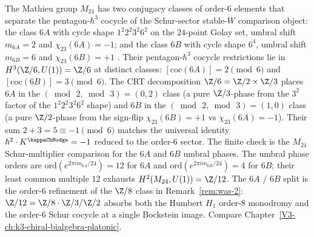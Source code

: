 \begin{remark}
\label{rem:was-6A-6B}
The Mathieu group $M_{24}$ has two conjugacy classes of order-$6$
elements that separate the pentagon-$\hbar^3$ cocycle of the
Schur-sector stable-$W$ comparison object:
the class $6A$ with cycle shape $1^2 2^2 3^2 6^2$ on the $24$-point
Golay set, umbral shift $m_{6A} = 2$ and $\chi_{23}(6A) = -1$; and
the class $6B$ with cycle shape $6^4$, umbral shift $m_{6B} = 6$ and
$\chi_{23}(6B) = +1$ \cite{ChengDuncanHarvey2014,ConwayCurtisNortonParkerWilson1985}.
Their pentagon-$\hbar^3$ cocycle restrictions lie in
$H^3(\Z/6, U(1)) = \Z/6$ at distinct classes:
$[\mathrm{coc}(6A)] = 2 \pmod{6}$ and $[\mathrm{coc}(6B)] = 3 \pmod{6}$.
The CRT decomposition $\Z/6 = \Z/2 \times \Z/3$ places $6A$ in the
$(\bmod\,2,\bmod\,3) = (0,2)$ class (a pure $\Z/3$-phase from the
$3^2$ factor of the $1^2 2^2 3^2 6^2$ shape) and $6B$ in the
$(\bmod\,2,\bmod\,3) = (1,0)$ class (a pure $\Z/2$-phase from the
sign-flip $\chi_{23}(6B) = +1$ vs $\chi_{23}(6A) = -1$). Their sum
$2 + 3 = 5 \equiv -1 \pmod 6$ matches the universal identity
$\hbar^2 \cdot K^{\kappaChHodge} = -1$ reduced to the order-$6$
sector. The finite check is the $M_{24}$ Schur-multiplier comparison
for the $6A$ and $6B$ umbral phases.
The umbral phase orders are $\mathrm{ord}(e^{2\pi i m_{6A}/24}) = 12$
for $6A$ and $\mathrm{ord}(e^{2\pi i m_{6B}/24}) = 4$ for $6B$; their
least common multiple $12$ exhausts $H^2(M_{24}, U(1)) = \Z/12$.
The $6A$ / $6B$ split is the order-$6$ refinement of the $\Z/8$ class
in Remark~\ref{rem:was-2}: $\Z/12 = \Z/8 \cdot \Z/3 / \Z/2$
absorbs both the Humbert $H_1$ order-$8$ monodromy and the order-$6$
Schur cocycle at a single Bockstein image. Compare
Chapter~\ref{V3-ch:k3-chiral-bialgebra-platonic}.
\end{remark}

